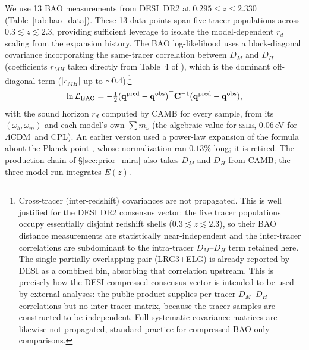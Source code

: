 \documentclass[12pt,a4paper]{article}
\newcommand{\SSEE}{\ifmmode\mathrm{SSEE}\else\textsc{ssee}\fi}
\newcommand{\LCDM}{\ifmmode\Lambda\mathrm{CDM}\else$\Lambda$CDM\fi}
\begin{document}
We use 13 BAO measurements from DESI~DR2 \citep{DESI_DR2} at
$0.295\leq z\leq2.330$ (Table~\ref{tab:bao_data}). These 13 data points
span five tracer populations across $0.3\lesssim z\lesssim 2.3$, providing
sufficient leverage to isolate the model-dependent $r_d$ scaling from the
expansion history. The BAO log-likelihood uses a block-diagonal covariance incorporating the same-tracer correlation between $D_M$ and $D_H$ (coefficients $r_{MH}$ taken directly from Table~4 of \citealt{DESI_DR2}), which is the dominant off-diagonal term ($|r_{MH}|$ up to $\sim0.4$).\footnote{Cross-tracer (inter-redshift) covariances are not propagated. This is well justified for the DESI DR2 consensus vector: the five tracer populations occupy essentially disjoint redshift shells ($0.3\lesssim z\lesssim 2.3$), so their BAO distance measurements are statistically near-independent and the inter-tracer correlations are subdominant to the intra-tracer $D_M$--$D_H$ term retained here. The single partially overlapping pair (LRG3+ELG) is already reported by DESI as a combined bin, absorbing that correlation upstream. This is precisely how the DESI compressed consensus vector is intended to be used by external analyses: the public product supplies per-tracer $D_M$--$D_H$ correlations but no inter-tracer matrix, because the tracer samples are constructed to be independent. Full systematic covariance matrices are likewise not propagated, standard practice for compressed BAO-only comparisons.}
\begin{equation}
  \ln\mathcal{L}_{\rm BAO}
  = -\tfrac{1}{2} (\mathbf{q}^{\rm pred}-\mathbf{q}^{\rm obs})^\top \mathbf{C}^{-1} (\mathbf{q}^{\rm pred}-\mathbf{q}^{\rm obs}),
\end{equation}
with the sound horizon $r_d$ computed by CAMB for every sample, from its
$(\omega_b,\omega_m)$ and each model's own $\sum m_\nu$ (the algebraic value for
\SSEE, $0.06$\,eV for \LCDM\ and CPL). An earlier version used a power-law
expansion of the \citet{EisensteinHu1998} formula about the Planck point
\citep[compare][]{Aubourg2015}, whose normalization ran $0.13\%$ long; it is
retired. The production chain of \S\ref{sec:prior_mira} also takes $D_M$ and $D_H$
from CAMB; the three-model run integrates $E(z)$.
\end{document}

